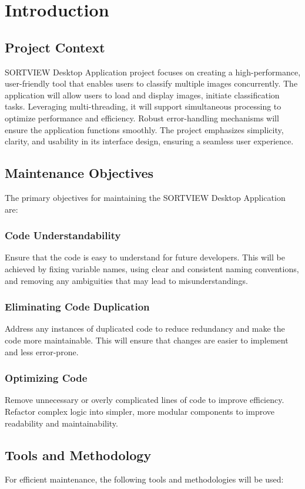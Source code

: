 \documentclass[12pt,a4paper]{article}
\begin{document}
\section{Introduction}
\subsection{Project Context}
SORTVIEW Desktop Application project focuses on creating a high-performance, user-friendly tool 
that enables users to classify multiple images concurrently. The application will allow users to load and 
display images, initiate classification tasks. Leveraging multi-threading, it will support simultaneous 
processing to optimize performance and efficiency. Robust error-handling mechanisms will ensure the 
application functions smoothly. The project emphasizes simplicity, clarity, and usability in its interface 
design, ensuring a seamless user experience. 
\subsection{Maintenance Objectives}
The primary objectives for maintaining the SORTVIEW Desktop Application are:

\subsubsection{Code Understandability}
Ensure that the code is easy to understand for future developers. This will be achieved by fixing variable names, using clear and consistent naming conventions, and removing any ambiguities that may lead to misunderstandings.

\subsubsection{Eliminating Code Duplication}
Address any instances of duplicated code to reduce redundancy and make the code more maintainable. This will ensure that changes are easier to implement and less error-prone.

\subsubsection{Optimizing Code}
Remove unnecessary or overly complicated lines of code to improve efficiency. Refactor complex logic into simpler, more modular components to improve readability and maintainability.
\subsection{Tools and Methodology}
For efficient maintenance, the following tools and methodologies will be used:
\end{document}
